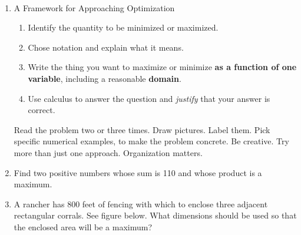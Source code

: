 \documentclass[11pt,fleqn]{article}
\begin{document}
\vspace*{-0.7in}

\begin{center}
  \Large{}\\
\end{center}
\begin{enumerate}
\item A Framework for Approaching Optimization
\begin{enumerate}
\item Identify the quantity to be minimized or maximized.
\item Chose notation and explain what it means.
\item Write the thing you want to maximize or minimize \textbf{as a function of one variable}, including a reasonable \textbf{domain}.
\item Use calculus to answer the question and \emph{justify} that your answer is correct.
\end{enumerate}
Read the problem two or three times. Draw pictures. Label them. Pick specific numerical examples, to make the problem concrete. Be creative. Try more than just one approach. Organization matters.
\item  Find two positive numbers whose sum is 110 and whose product is a maximum.
\vfill
\newpage
\item A rancher has 800 feet of fencing with which to
  enclose three adjacent rectangular corrals. See figure below. What dimensions should
  be used so that the enclosed area will be a maximum?\\
  
\vfill
   
\end{enumerate}
\end{document}
